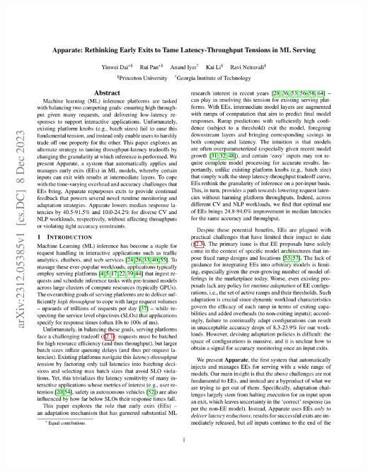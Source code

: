 \documentclass[12pt,aspectratio=169]{beamer}
\begin{document}
\begin{frame}
        \includegraphics[page=10,trim=53.55bp 639.24bp 318.55bp 73.53bp,clip]{apparate.pdf}
    \end{frame}
\end{document}
